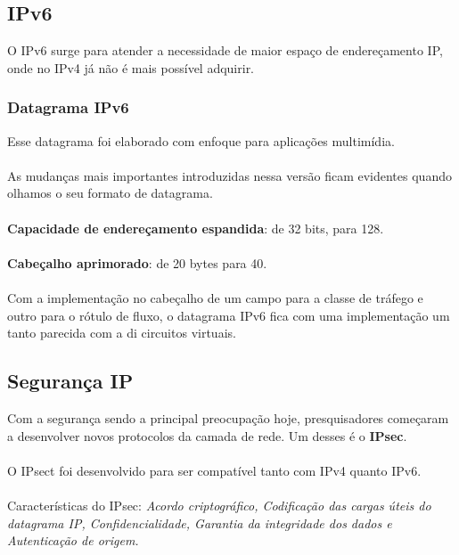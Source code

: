 \documentclass[a4paper, 12pt]{article}
\begin{document}
    \subsection{IPv6}
    O IPv6 surge para atender a necessidade de maior espaço de endereçamento IP, onde no IPv4 já não é mais possível adquirir.
    


    \subsubsection{Datagrama IPv6}
    Esse datagrama foi elaborado com enfoque para aplicações multimídia.
    \\\\
    As mudanças mais importantes introduzidas nessa versão ficam evidentes quando olhamos o seu formato de datagrama.
    \\\\
    \textbf{Capacidade de endereçamento espandida}: de 32 bits, para 128.
    \\\\
    \textbf{Cabeçalho aprimorado}: de 20 bytes para 40.
    \\\\
    Com a implementação no cabeçalho de um campo para a classe de tráfego e outro para o rótulo de fluxo, o datagrama IPv6 fica com uma 
    implementação um tanto parecida com a di circuitos virtuais.
    
    \subsection{Segurança IP}
        Com a segurança sendo a principal preocupação hoje, presquisadores começaram a desenvolver novos protocolos da camada de 
        rede. Um desses é o \textbf{IPsec}.
        \\\\
        O IPsect foi desenvolvido para ser compatível tanto com IPv4 quanto IPv6.
        \\\\
        Características do IPsec: \textit{Acordo criptográfico, Codificação das cargas úteis do datagrama IP, Confidencialidade,
        Garantia da integridade dos dados e Autenticação de origem.}
\end{document}
